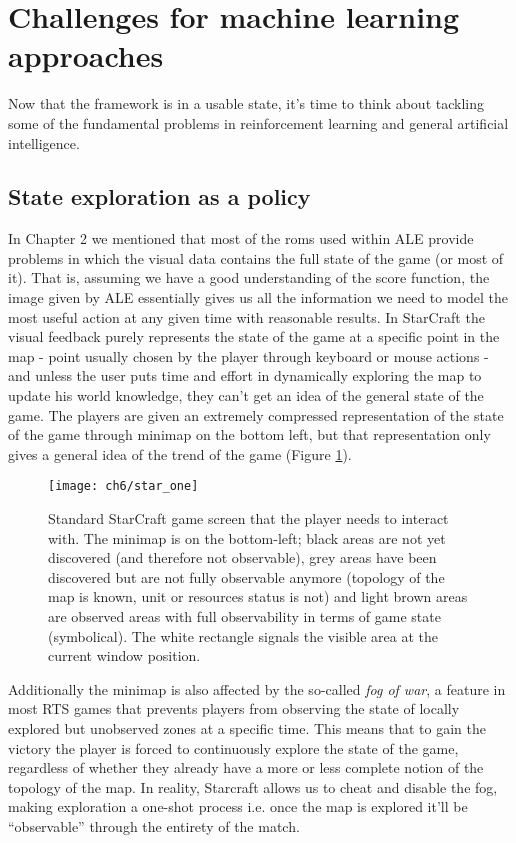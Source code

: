 \section{Challenges for machine learning approaches}

Now that the framework is in a usable state, it's time to think about tackling
some of the fundamental problems in reinforcement learning and general
artificial intelligence.

\subsection{State exploration as a policy}
In Chapter 2 we mentioned that most of the roms used within ALE provide problems
in which the visual data contains the full state of the game (or most of it).
That is, assuming we have a good understanding of the score function, the image
given by ALE essentially gives us all the information we need to model the most
useful action at any given time with reasonable results. In StarCraft the visual
feedback purely represents the state of the game at a specific point in the map
- point usually chosen by the player through keyboard or mouse actions - and
unless the user puts time and effort in dynamically exploring the map to update
his world knowledge, they can't get an idea of the general state of the game.
The players are given an extremely compressed representation of the state of the
game through minimap on the bottom left, but that representation only gives a
general idea of the trend of the game (Figure \ref{fig:one_star}).

\begin{figure}[h]
    \centering
    \texttt{[image: ch6/star\_one]}
    \caption{Standard StarCraft game screen that the player needs to interact
      with. The minimap is on the bottom-left; black areas are not yet
      discovered (and therefore not observable), grey areas have been discovered
      but are not fully observable anymore (topology of the map is known, unit
      or resources status is not) and light brown areas are observed areas with
      full observability in terms of game state (symbolical). The white
      rectangle signals the visible area at the current window position.}
    \label{fig:one_star}
\end{figure}

Additionally the minimap is also affected by the so-called \emph{fog of war}, a
feature in most RTS games that prevents players from observing the state of
locally explored but unobserved zones at a specific time. This means that to
gain the victory the player is forced to continuously explore the state of the
game, regardless of whether they already have a more or less complete notion of
the topology of the map. In reality, Starcraft allows us to cheat and disable
the fog, making exploration a one-shot process i.e. once the map is explored
it’ll be “observable” through the entirety of the match.

